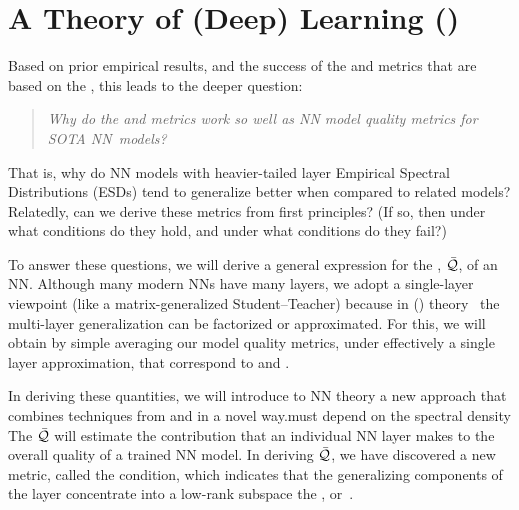 \section{A \SemiEmpirical Theory of (Deep) Learning (\SETOL)}
\label{sxn:setol}
Based on prior empirical results, and the success of the \ALPHA and \ALPHAHAT metrics that are based on the \HTSR \Phenomenology, this leads to the deeper question: 
%
\begin{quote}
\emph{Why do the \ALPHA and \ALPHAHAT metrics work so well as NN model quality metrics for SOTA NN~models?}
\end{quote}
That is, why do NN models with heavier-tailed layer Empirical Spectral Distributions  (ESDs) tend to generalize better when compared to related models?
Relatedly, can we derive these metrics from first principles?
(If so, then under what conditions do they hold, and under what conditions do they fail?)

\noindent
To answer these questions, we will derive a general expression for the \LayerQuality, $\bar{\mathcal{Q}}$, of an NN.
Although many modern NNs have many layers, we adopt a single-layer viewpoint (like a matrix-generalized Student–Teacher) because in \StatisticalMechanicsOfGeneralization (\SMOG) theory~\cite{SST92,STS90} the multi-layer generalization can be factorized or approximated.
For this, we will obtain by simple averaging our model quality metrics, under effectively a single layer approximation, that correspond to \ALPHA and \ALPHAHAT.


In deriving these quantities, we will introduce to NN theory a new \SemiEmpirical approach that combines techniques from \STATMECH and \RMT in a novel way.must depend on the spectral density
The \LayerQuality $\bar{\mathcal{Q}}$ will estimate the contribution that an individual NN layer makes to the overall quality of a trained NN model.
In deriving $\bar{\mathcal{Q}}$, we have discovered a new \LayerQuality metric, called the \TRACELOG condition,
which indicates that the generalizing components of the layer  concentrate into a low-rank subspace the \emph{\EffectiveCorrelationSpace}, or~\ECS. 

